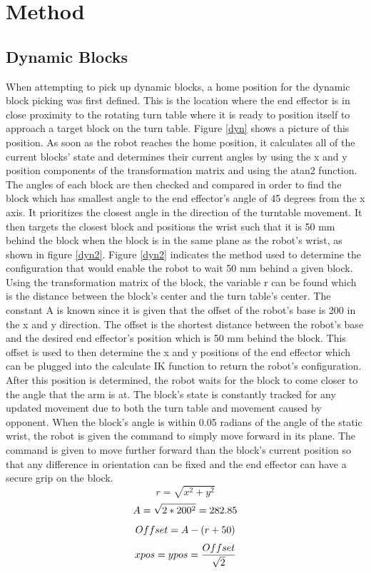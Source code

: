 \documentclass{article}
\begin{document}
\section{Method}
    \subsection{Dynamic Blocks}
    When attempting to pick up dynamic blocks, a home position for the dynamic block picking was first defined. This is the location where the end effector is in close proximity to the rotating turn table where it is ready to position itself to approach a target block on the turn table. Figure \ref{dyn} shows a picture of this position. As soon as the robot reaches the home position, it calculates all of the current blocks' state and determines their current angles by using the x and y position components of the transformation matrix and using the atan2 function. The angles of each block are then checked and compared in order to find the block which has smallest angle to the end effector's angle of 45 degrees from the x axis. It prioritizes the closest angle in the direction of the turntable movement. It then targets the closest block and positions the wrist such that it is 50 mm behind the block when the block is in the same plane as the robot’s wrist, as shown in figure \ref{dyn2}. Figure \ref{dyn2} indicates the method used to determine the configuration that would enable the robot to wait 50 mm behind a given block. Using the transformation matrix of the block, the variable r can be found which is the distance between the block's center and the turn table's center. The constant A is known since it is given that the offset of the robot's base is 200 in the x and y direction. The offset is the shortest distance between the robot's base and the desired end effector's position which is 50 mm behind the block. This offset is used to then determine the x and y positions of the end effector which can be plugged into the calculate IK function to return the robot's configuration. After this position is determined, the robot waits for the block to come closer to the angle that the arm is at. The block’s state is constantly tracked for any updated movement due to both the turn table and movement caused by opponent. When the block’s angle is within 0.05 radians of the angle of the static wrist, the robot is given the command to simply move forward in its plane. The command is given to move further forward than the block’s current position so that any difference in orientation can be fixed and the end effector can have a secure grip on the block. 
    \[
    r=\sqrt{x^2+y^2}
    \]
    \[
    A=\sqrt{2*200^2}=282.85 \\
    \]
    \[
    Offset=A-(r+50) \\
    \]
    \[
    x pos=y pos=\frac{Offset}{\sqrt{2}}\\
    \]
    
\end{document}
